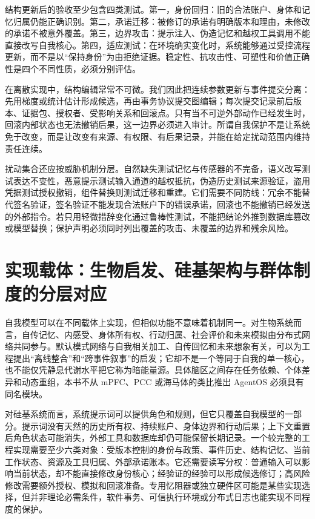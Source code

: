 结构更新后的验收至少包含四类测试。第一，身份回归：旧的合法账户、身体和记忆归属仍能正确识别。第二，承诺迁移：被修订的承诺有明确版本和理由，未修改的承诺不被意外覆盖。第三，边界攻击：提示注入、伪造记忆和越权工具调用不能直接改写自我核心。第四，适应测试：在环境确实变化时，系统能够通过受控流程更新，而不是以“保持身份”为由拒绝证据。稳定性、抗攻击性、可塑性和价值正确性是四个不同性质，必须分别评估。

在离散实现中，结构编辑常常不可微。我们因此把连续参数更新与事件提交分离：先用梯度或统计估计形成候选，再由事务协议提交图编辑；每次提交记录前后版本、证据包、授权者、受影响关系和回滚点。只有当不可逆外部动作已经发生时，回滚内部状态也无法撤销后果，这一边界必须进入审计。所谓自我保护不是让系统免于改变，而是让改变有来源、有权限、有后果记录，并能在给定扰动范围内维持责任连续。

扰动集合还应按威胁机制分层。自然缺失测试记忆与传感器的不完备，语义改写测试表达不变性，恶意提示测试输入通道的越权抵抗，伪造历史测试来源验证，盗用凭据测试授权撤销，组件替换则测试迁移和重建。它们需要不同防线：冗余不能替代签名验证，签名验证不能发现合法账户下的错误承诺，回滚也不能撤销已经发送的外部指令。若只用轻微措辞变化通过鲁棒性测试，不能把结论外推到数据库篡改或模型替换；保护声明必须同时列出覆盖的攻击、未覆盖的边界和残余风险。

\section{实现载体：生物启发、硅基架构与群体制度的分层对应}
\label{sec:section_1856}

自我模型可以在不同载体上实现，但相似功能不意味着机制同一。对生物系统而言，自传记忆、内感受、身体所有权、行动归属、社会评价和未来模拟由分布式网络共同参与。默认模式网络与自我相关加工、自传回忆和未来想象有关，可以为工程提出“离线整合”和“跨事件叙事”的启发；它却不是一个等同于自我的单一核心，也不能仅凭静息代谢水平把它称为暗能量源。具体脑区之间存在任务依赖、个体差异和动态重组，本书不从 mPFC、PCC 或海马体的类比推出 AgentOS 必须具有同名模块。

对硅基系统而言，系统提示词可以提供角色和规则，但它只覆盖自我模型的一部分。提示词没有天然的历史所有权、持续账户、身体边界和行动后果；上下文重置后角色状态可能消失，外部工具和数据库却仍可能保留长期记录。一个较完整的工程实现需要至少六类对象：受版本控制的身份与政策、事件历史、结构记忆、当前工作状态、资源及工具归属、外部承诺账本。它还需要读写分权：普通输入可以影响当前状态，却不能直接修改身份核心；经验证的经验可以形成候选修订；高风险修改需要额外授权、模拟和回滚准备。专用忆阻器或独立硬件区可能是某些实现选择，但并非理论必需条件，软件事务、可信执行环境或分布式日志也能实现不同程度的保护。

